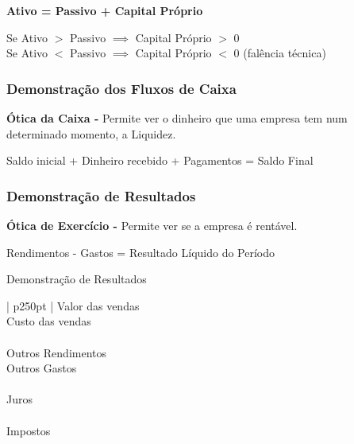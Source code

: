 \documentclass[11pt]{article}
\begin{document}
\begin{center}
    \textbf{Ativo = Passivo + Capital Próprio}
\end{center}

Se Ativo $>$ Passivo $\implies $ Capital Próprio $>$ 0 \\
Se Ativo $<$ Passivo $\implies $ Capital Próprio $<$ 0 (falência técnica)


\subsubsection{Demonstração dos Fluxos de Caixa}

\textbf{Ótica da Caixa -} Permite ver o dinheiro que uma empresa tem num determinado momento, a Liquidez.

\begin{center}
    Saldo inicial + Dinheiro recebido + Pagamentos = Saldo Final
\end{center}

\subsubsection{Demonstração de Resultados}

\textbf{Ótica de Exercício -} Permite ver se a empresa é rentável.

\begin{center}
    Rendimentos - Gastos = Resultado Líquido do Período
\end{center}

\begin{center}
    Demonstração de Resultados \\
    \begin{tabular}[t]{ | p{250pt} | }
        \hline Valor das vendas                                                   \\
        \hline Custo das vendas                                                   \\
        \hline {}              \\
        \hline Outros Rendimentos                                                 \\
        \hline Outros Gastos                                                      \\
        \hline {}        \\
        \hline Juros                                                              \\
        \hline {} \\
        \hline Impostos                                                           \\
        \hline {}            \\
        \hline
    \end{tabular}
\end{center}
\end{document}
